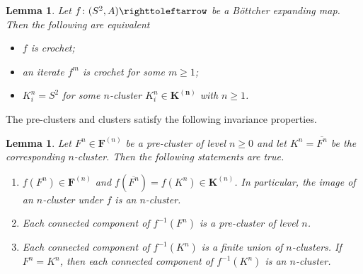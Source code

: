\documentclass{amsart}
\theoremstyle{plain}
\newtheorem{lemma}[theorem]{Lemma}
\theoremstyle{definition}
\theoremstyle{remark}
\newcommand\selfmap{\righttoleftarrow}
\begin{document}
\begin{lemma}
\label{lem:crochet-iteration}
Let $f\colon (S^2,A) \selfmap$ be a B\"{o}ttcher expanding map. Then the following are equivalent
 \begin{itemize}
   \item $f$ is crochet;
   \item an iterate $f^m$ is crochet for some $m\ge1$;
   \item $K^n_i=S^2$ for some $n$-cluster $K^n_i \in \mathbf {K^{(n)}}$ with $n\ge 1$.
 \end{itemize}
\end{lemma}




The pre-clusters and clusters satisfy the following invariance properties.


\begin{lemma}\label{lem: images of clusters} Let $F^n\in \mathbf{F}^{(n)}$ be a pre-cluster of level $n\geq 0$ and let $K^n=\overline{F^n}$ be the corresponding $n$-cluster.  Then the following statements are true.
\begin{enumerate}[label=\text{(\roman*)},font=\normalfont,leftmargin=*]
\item\label{lem: images of clusters:1} $f(F^n) \in  \mathbf{F}^{(n)}$ and $f(\overline{F^n})=f(K^n) \in  \mathbf{K}^{(n)}$.  In particular, the image of an $n$-cluster under $f$ is an $n$-cluster.
\item\label{lem: images of clusters:2} Each connected component of $f^{-1}(F^n)$ is a pre-cluster of level $n$.
\item\label{lem: images of clusters:3} Each connected component of $f^{-1}(K^n)$ is a finite union of $n$-clusters. If $F^n=K^n$, then each connected component of $f^{-1}(K^n)$ is an $n$-cluster.
\end{enumerate}
\end{lemma}
\end{document}
